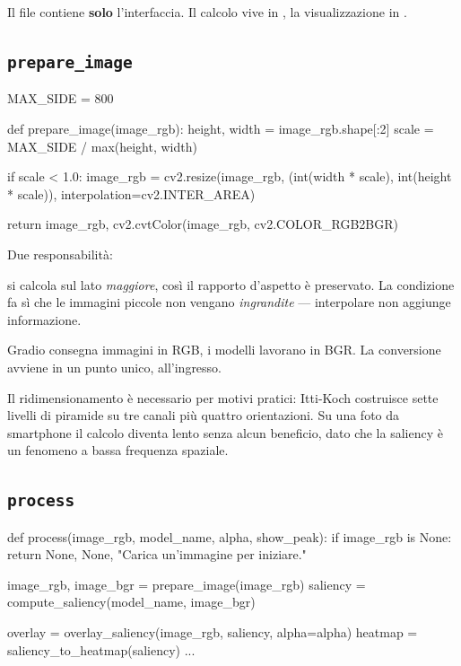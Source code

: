 Il file contiene \textbf{solo} l'interfaccia. Il calcolo vive in , la
visualizzazione in .

\subsection{\texttt{prepare\_image}}

\begin{idebox}
\begin{pycode}
MAX_SIDE = 800

def prepare_image(image_rgb):
    height, width = image_rgb.shape[:2]
    scale = MAX_SIDE / max(height, width)

    if scale < 1.0:
        image_rgb = cv2.resize(image_rgb,
                               (int(width * scale), int(height * scale)),
                               interpolation=cv2.INTER_AREA)

    return image_rgb, cv2.cvtColor(image_rgb, cv2.COLOR_RGB2BGR)
\end{pycode}
\end{idebox}

Due responsabilità:

\begin{description}[leftmargin=1.2em,style=nextline]
\item[Ridimensionamento condizionale]  si calcola sul lato \emph{maggiore}, così il
rapporto d'aspetto è preservato. La condizione  fa sì che le immagini piccole
non vengano \emph{ingrandite} --- interpolare non aggiunge informazione.

\item[Conversione RGB $\to$ BGR] Gradio consegna immagini in RGB, i modelli lavorano in BGR. La
conversione avviene in un punto unico, all'ingresso.
\end{description}

Il ridimensionamento è necessario per motivi pratici: Itti-Koch costruisce sette livelli di
piramide su tre canali più quattro orientazioni. Su una foto da smartphone il calcolo diventa
lento senza alcun beneficio, dato che la saliency è un fenomeno a bassa frequenza spaziale.

\subsection{\texttt{process}}

\begin{idebox}
\begin{pycode}
def process(image_rgb, model_name, alpha, show_peak):
    if image_rgb is None:
        return None, None, "Carica un'immagine per iniziare."

    image_rgb, image_bgr = prepare_image(image_rgb)
    saliency = compute_saliency(model_name, image_bgr)

    overlay = overlay_saliency(image_rgb, saliency, alpha=alpha)
    heatmap = saliency_to_heatmap(saliency)
    ...
\end{pycode}
\end{idebox}

